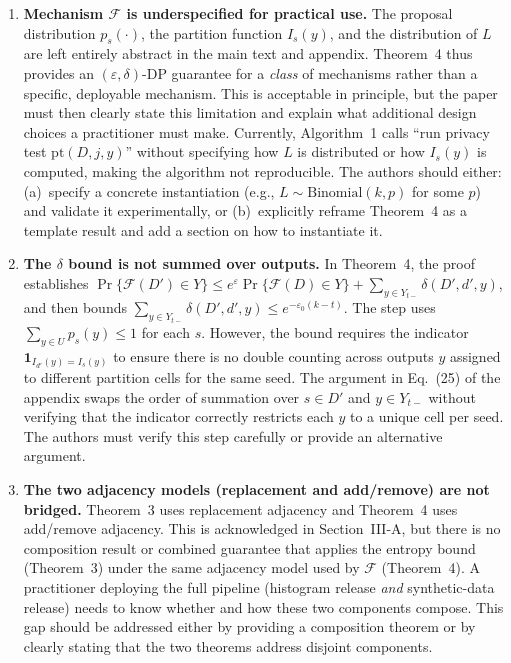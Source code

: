 \documentclass[12pt]{article}
\begin{document}
\begin{enumerate}[label=\textbf{M\arabic*.}, leftmargin=*, wide=0pt]
\item \textbf{Mechanism $\mathcal{F}$ is underspecified for practical use.}
The proposal distribution $p_s(\cdot)$, the partition function $I_s(y)$, and the distribution of $L$ are left entirely abstract in the main text and appendix. Theorem~4 thus provides an $(\varepsilon,\delta)$-DP guarantee for a \emph{class} of mechanisms rather than a specific, deployable mechanism. This is acceptable in principle, but the paper must then clearly state this limitation and explain what additional design choices a practitioner must make. Currently, Algorithm~1 calls ``run privacy test $\mathrm{pt}(D,j,y)$'' without specifying how $L$ is distributed or how $I_s(y)$ is computed, making the algorithm not reproducible. The authors should either: (a)~specify a concrete instantiation (e.g., $L \sim \mathrm{Binomial}(k, p)$ for some $p$) and validate it experimentally, or (b)~explicitly reframe Theorem~4 as a template result and add a section on how to instantiate it.

\item \textbf{The $\delta$ bound is not summed over outputs.}
In Theorem~4, the proof establishes $\Pr\{\mathcal{F}(D') \in Y\} \leq e^\varepsilon \Pr\{\mathcal{F}(D) \in Y\} + \sum_{y \in Y_{t-}} \delta(D', d', y)$, and then bounds $\sum_{y \in Y_{t-}} \delta(D', d', y) \leq e^{-\varepsilon_0(k-t)}$. The step uses $\sum_{y \in U} p_s(y) \leq 1$ for each $s$. However, the bound requires the indicator $\mathbf{1}_{I_{d'}(y) = I_s(y)}$ to ensure there is no double counting across outputs $y$ assigned to different partition cells for the same seed. The argument in Eq.~(25) of the appendix swaps the order of summation over $s \in D'$ and $y \in Y_{t-}$ without verifying that the indicator correctly restricts each $y$ to a unique cell per seed. The authors must verify this step carefully or provide an alternative argument.

\item \textbf{The two adjacency models (replacement and add/remove) are not bridged.}
Theorem~3 uses replacement adjacency and Theorem~4 uses add/remove adjacency. This is acknowledged in Section~III-A, but there is no composition result or combined guarantee that applies the entropy bound (Theorem~3) under the same adjacency model used by $\mathcal{F}$ (Theorem~4). A practitioner deploying the full pipeline (histogram release \emph{and} synthetic-data release) needs to know whether and how these two components compose. This gap should be addressed either by providing a composition theorem or by clearly stating that the two theorems address disjoint components.

\end{enumerate}
\end{document}
